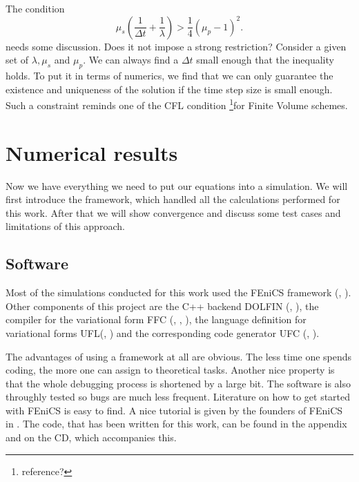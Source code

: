 \documentclass[12pt,a4paper,twoside, open=right]{scrreprt}
\theoremstyle{definition}
\theoremstyle{plain}
\begin{document}
The condition 
\begin{equation}
\mu_s\left(\frac{1}{\Delta t}+\frac{1}{\lambda}\right)>\frac{1}{4}(\mu_p-1)^2.
\end{equation} needs some discussion. Does it not impose a strong restriction? Consider a given set of $\lambda,\mu_s$ and $\mu_p$. We can always find a $\Delta t$ small enough that the inequality holds. To put it in terms of numerics, we find that we can only guarantee the existence and uniqueness of the solution if the time step size is small enough. Such a constraint reminds one of the \textsc{CFL} condition \footnote{reference?}for Finite Volume schemes. 
\section{Numerical results}
Now we have everything we need to put our equations into a simulation. We will first introduce the framework, which handled all the calculations performed for this work. After that we will show convergence and discuss some test cases and limitations of this approach.
\subsection{Software}
Most of the simulations conducted for this work used the FEniCS framework (\cite{AlnaesBlechta2015a}, \cite{LoggMardalEtAl2012a}). Other components of this project are the C++ backend DOLFIN (\cite{LoggWells2010a}, \cite{LoggWellsEtAl2012a}), the compiler for the variational form FFC (\cite{KirbyLogg2006a}, \cite{LoggOlgaardEtAl2012a}, \cite{OlgaardWells2010b}), the language definition for variational forms UFL(\cite{AlnaesEtAl2012}, \cite{Alnaes2012a}) and the corresponding code generator UFC (\cite{AlnaesLoggEtAl2009a}, \cite{AlnaesLoggEtAl2012a}).
\par 
The advantages of using a framework at all are obvious. The less time one spends coding, the more one can assign to theoretical tasks. Another nice property is that the whole debugging process is shortened by a large bit. The software is also throughly tested so bugs are much less frequent. Literature on how to get started with FEniCS is easy to find. A nice tutorial is given by the founders of FEniCS in  \cite{Langtangen2017a}. The code, that has been written for this work, can be found in the appendix and on the CD, which accompanies this.
\end{document}
